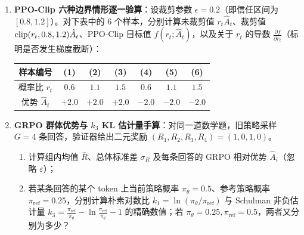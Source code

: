 \begin{enumerate}
  \item[\textbf{6.3.1}] \textbf{PPO-Clip 六种边界情形逐一验算}：设裁剪参数 $\epsilon = 0.2$（即信任区间为 $[0.8, 1.2]$）。对下表中的 6 个样本，分别计算未裁剪值 $r_t \hat{A}_t$、裁剪值 $\operatorname{clip}(r_t, 0.8, 1.2)\hat{A}_t$、PPO-Clip 目标值 $f(r_t; \hat{A}_t)$，以及关于 $r_t$ 的导数 $\frac{\partial f}{\partial r_t}$（标明是否发生梯度截断）：
  \begin{center}
  \footnotesize
  \begin{tabular}{ccccccc}
  \toprule
  样本编号 & (1) & (2) & (3) & (4) & (5) & (6) \\
  \midrule
  概率比 $r_t$ & $0.6$ & $1.1$ & $1.5$ & $0.6$ & $1.1$ & $1.5$ \\
  优势 $\hat{A}_t$ & $+2.0$ & $+2.0$ & $+2.0$ & $-2.0$ & $-2.0$ & $-2.0$ \\
  \bottomrule
  \end{tabular}
  \end{center}

  \item[\textbf{6.3.2}] \textbf{GRPO 群体优势与 $k_3$ KL 估计量手算}：对同一道数学题，旧策略采样 $G = 4$ 条回答，验证器给出二元奖励 $(R_1, R_2, R_3, R_4) = (1, 0, 1, 0)$。
  \begin{enumerate}
    \item 计算组内均值 $\bar{R}$、总体标准差 $\sigma_R$ 及每条回答的 GRPO 相对优势 $\hat{A}_i$（忽略 $\varepsilon$）；
    \item 若某条回答的某个 token 上当前策略概率 $\pi_\theta = 0.5$、参考策略概率 $\pi_{\mathrm{ref}} = 0.25$，分别计算朴素对数比 $k_1 = \ln(\pi_\theta/\pi_{\mathrm{ref}})$ 与 Schulman 非负估计量 $k_3 = \frac{\pi_{\mathrm{ref}}}{\pi_\theta} - \ln\frac{\pi_{\mathrm{ref}}}{\pi_\theta} - 1$ 的精确数值；若 $\pi_\theta = 0.25, \pi_{\mathrm{ref}} = 0.5$，两者又分别为多少？
  \end{enumerate}
\end{enumerate}


